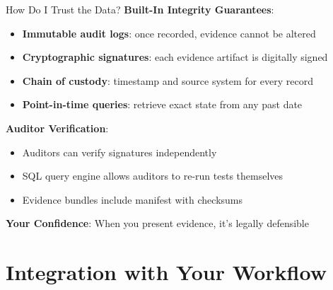 \documentclass[aspectratio=169]{beamer}
\begin{document}
\begin{frame}{How Do I Trust the Data?}
  \textbf{Built-In Integrity Guarantees}:
  
  \vspace{0.3cm}
  
  \begin{itemize}
    \item \textbf{Immutable audit logs}: once recorded, evidence cannot be altered
    \item \textbf{Cryptographic signatures}: each evidence artifact is digitally signed
    \item \textbf{Chain of custody}: timestamp and source system for every record
    \item \textbf{Point-in-time queries}: retrieve exact state from any past date
  \end{itemize}
  
  \vspace{0.3cm}
  
  \textbf{Auditor Verification}:
  \begin{itemize}
    \item Auditors can verify signatures independently
    \item SQL query engine allows auditors to re-run tests themselves
    \item Evidence bundles include manifest with checksums
  \end{itemize}
  
  \vspace{0.3cm}
  
  \textbf{Your Confidence}: When you present evidence, it's legally defensible
\end{frame}

\section{Integration with Your Workflow}
\end{document}
